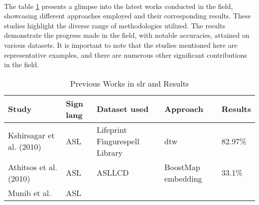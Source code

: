 \paragraph{}
The table \ref{tab:previous-works} presents a glimpse into the latest works conducted in the field, showcasing different approaches employed and their corresponding results. These studies highlight the diverse range of methodologies utilized. The results demonstrate the progress made in the field, with notable accuracies, attained on various datasets. It is important to note that the studies mentioned here are representative examples, and there are numerous other significant contributions in the field.
\begin{table}[h]
	\centering
	\caption{Previous Works in \ac{slr} and Results}
	\label{tab:previous-works}
	\begin{tabular}{|p{}|p{}|p{}|p{}|p{}|}
		\hline
		\textbf{Study} & \textbf{Sign lang} & \textbf{Dataset used} & \textbf{Approach} & \textbf{Results} \\
		\hline
		Kshirsagar et al. (2010) \cite{5656963} & ASL & Lifeprint Fingurespell Library & \ac{dtw} & 82.97\% \\
		\hline
		Athitsos et al.  (2010) \cite{5995718}& ASL & ASLLCD & BoostMap embedding & 33.1\% \\
		\hline
		Munib et al. & ASL
	\end{tabular}
\end{table}
